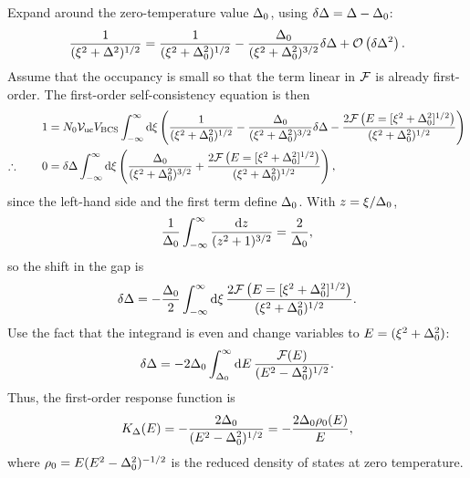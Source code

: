 Expand around the zero-temperature value $\Delta_0$, using
$\delta\Delta = \Delta - \Delta_0$:
\begin{equation}
\frac{1}{(\xi^2 + \Delta^2)^{1/2}}
  =
  \frac{1}{(\xi^2 + \Delta_0^2)^{1/2}}
  - \frac{\Delta_0 }{(\xi^2 + \Delta_0^2)^{3/2}} \delta\Delta
  + \mathcal{O}\left( \delta\Delta^2 \right).
\end{equation}
Assume that the occupancy is small so that the term linear in $\mathcal{F}$ is already first-order.
The first-order self-consistency equation is then
\begin{align}
1
  &=
  N_0 \mathcal{V}_\mathrm{uc} V_\mathrm{BCS}
  \int_{-\infty}^\infty \dd{\xi}
  \left( \frac{1}{(\xi^2 + \Delta_0^2)^{1/2}}
  - \frac{\Delta_0}{(\xi^2 + \Delta_0^2)^{3/2}} \delta\Delta
  - \frac{2 \mathcal{F} \left(E = [\xi^2 + \Delta_0^2]^{1/2} \right)}{(\xi^2 + \Delta_0^2)^{1/2}}
  \right) \\
\therefore \qquad
0
  &=
  \delta\Delta \int_{-\infty}^\infty \dd{\xi} \left(
  \frac{\Delta_0}{(\xi^2 + \Delta_0^2)^{3/2}}
 + \frac{2 \mathcal{F} \left(E = [\xi^2 + \Delta_0^2]^{1/2} \right)}{(\xi^2 + \Delta_0^2)^{1/2}}
 \right),
\end{align}
since the left-hand side and the first term define $\Delta_0$.
With $z = \xi / \Delta_0$,
\begin{equation}
\frac{1}{\Delta_0} \int_{-\infty}^\infty \frac{\dd{z}}{(z^2 + 1)^{3/2}}
  =
  \frac{2}{\Delta_0},
\end{equation}
so the shift in the gap is
\begin{equation}
\delta\Delta
  =
  -\frac{\Delta_0}{2} \int_{-\infty}^\infty \dd{\xi}
   \frac{2 \mathcal{F} \left(E = [\xi^2 + \Delta_0^2]^{1/2} \right)}{(\xi^2 + \Delta_0^2)^{1/2}}.
\end{equation}
Use the fact that the integrand is even and change variables to
$E = (\xi^2 + \Delta_0^2)$:
\begin{equation}
\delta\Delta
  =
  - 2 \Delta_0 \int_{\Delta_0}^\infty \dd{E}
   \frac{\mathcal{F} (E)}{(E^2 - \Delta_0^2)^{1/2}}.
\end{equation}
Thus, the first-order response function is
\begin{equation}
K_\Delta(E)
  =
  -\frac{2 \Delta_0}{(E^2 - \Delta_0^2)^{1/2}}
  =
  -\frac{2 \Delta_0 \rho_0(E)}{E},
\label{eqn:first-order_response.responseqpoccupancy_gap}
\end{equation}
where
$\rho_0 = E (E^2 - \Delta_0^2)^{-1/2}$
is the reduced density of states at zero temperature.

